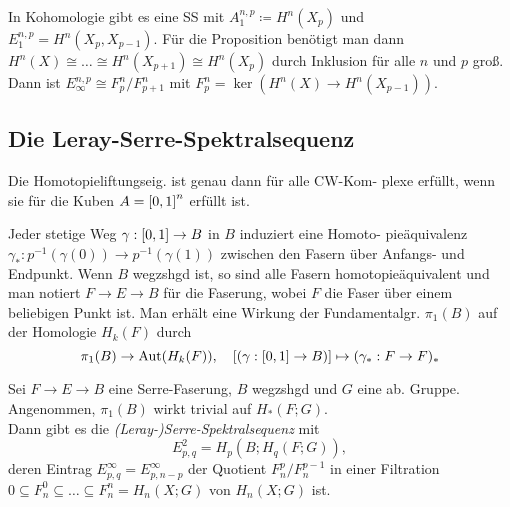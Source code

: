 \documentclass{cheat-sheet}
\newcommand{\nacong}{\!\cong\!} %
\newenvironment{centertikzcd}
  {\begin{center}\begin{tikzcd}}
  {\end{tikzcd}\end{center}}
\begin{document}
\begin{bem}
  In Kohomologie gibt es eine SS mit $A^{n,p}_1 \coloneqq H^n(X_p)$ und $E^{n,p}_1 = H^n(X_p, X_{p-1})$. Für die Proposition benötigt man dann $H^n(X) \nacong \ldots \nacong H^n(X_{p+1}) \nacong H^n(X_p)$ durch Inklusion für alle $n$ und $p$ groß. Dann ist $E^{n,p}_\infty \cong F^n_p / F^n_{p+1}$ mit $F^n_p \!=\! \ker(H^n(X) \!\to\! H^n(X_{p-1}))$.
\end{bem}

\subsection{Die Leray-Serre-Spektralsequenz}


\begin{lem}
  Die Homotopieliftungseig. ist genau dann für alle CW-Kom- plexe erfüllt, wenn sie für die Kuben $A = \left[ 0, 1 \right]^n$ erfüllt ist.
\end{lem}

\begin{bem}
  Jeder stetige Weg $\gamma : \left[ 0, 1 \right] \to B$ in $B$ induziert eine Homoto- pieäquivalenz $\gamma_* : p^{-1}(\gamma(0)) \to p^{-1}(\gamma(1))$ zwischen den Fasern über Anfangs- und Endpunkt.
  Wenn $B$ wegzshgd ist, so sind alle Fasern homotopieäquivalent und man notiert $F \to E \to B$ für die Faserung, wobei $F$ die Faser über einem beliebigen Punkt ist. Man erhält eine Wirkung der Fundamentalgr. $\pi_1(B)$ auf der Homologie $H_k(F)$ durch
  \[ \pi_1(B) \to \operatorname{Aut}(H_k(F)), \quad [(\gamma : \left[ 0, 1 \right] \to B)] \mapsto (\gamma_* : F \to F)_* \]
\end{bem}

\begin{thm}
  Sei $F \to E \to B$ eine Serre-Faserung, $B$ wegzshgd und $G$ eine ab. Gruppe. Angenommen, $\pi_1(B)$ wirkt trivial auf $H_*(F; G)$. \\
  Dann gibt es die \emph{(Leray-)Serre-Spektralsequenz} mit
  \[ E^2_{p,q} = H_p(B; H_q(F; G)), \]
  deren Eintrag $E^\infty_{p,q} = E^\infty_{p,n-p}$ der Quotient $F^p_n/F^{p-1}_n$ in einer Filtration
  $0 \subseteq F_n^0 \subseteq \ldots \subseteq F_n^n = H_n(X; G)$ von $H_n(X; G)$ ist.
\end{thm}
\end{document}
